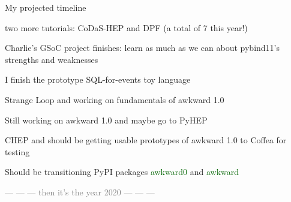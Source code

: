 \documentclass[aspectratio=169]{beamer}
\begin{document}
\begin{frame}{My projected timeline}
\large
\vspace{0.5 cm}
\begin{description}\setlength{\itemsep}{0.2 cm}
\item[July:] two more tutorials: CoDaS-HEP and DPF (a total of 7 this year!)
\item[August:] Charlie's GSoC project finishes: learn as much as we can about pybind11's strengths and weaknesses
\item[August:] I finish the prototype SQL-for-events toy language
\item[September:] Strange Loop and working on fundamentals of awkward 1.0
\item[October:] Still working on awkward 1.0 and maybe go to PyHEP
\item[November:] CHEP and should be getting usable prototypes of awkward 1.0 to Coffea for testing
\item[December:] Should be transitioning PyPI packages \textcolor{darkgreen}{awkward0} and \textcolor{darkgreen}{awkward}
\end{description}

\begin{center}
\textcolor{gray}{--- --- --- then it's the year 2020 --- --- ---}
\end{center}
\end{frame}
\end{document}
